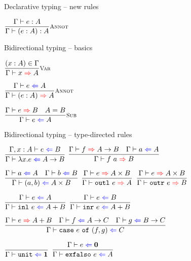 \documentclass{beamer}
\newcommand{\Fun}[2]{#1 \to #2}
\newcommand{\Prod}[2]{#1 \times #2}
\newcommand{\Sum}[2]{#1 + #2}
\newcommand{\Unit}{\textbf{1}}
\newcommand{\Empty}{\textbf{0}}
\newcommand{\annot}[2]{(#1 : #2)}
\newcommand{\fun}[2]{\lambda #1. #2}
\newcommand{\app}[2]{#1\ #2}
\newcommand{\pair}[2]{(#1, #2)}
\newcommand{\outl}[1]{\texttt{outl}\ #1}
\newcommand{\outr}[1]{\texttt{outr}\ #1}
\newcommand{\inl}[1]{\texttt{inl}\ #1}
\newcommand{\inr}[1]{\texttt{inr}\ #1}
\newcommand{\case}[3]{\texttt{case}\ #1\ \texttt{of}\ (#2, #3)}
\newcommand{\unit}{\texttt{unit}}
\newcommand{\exfalso}[1]{\texttt{exfalso}\ #1}
\newcommand{\fulltyping}[3]{#1 \vdash #2 : #3}
\newcommand{\typing}[2]{\fulltyping{\Gamma}{#1}{#2}}
\newcommand{\rulename}[1]{\textsc{\footnotesize{#1}}}
\newcommand{\infrule}[3][]{\displaystyle \frac{#2}{#3} \rulename{#1}}
\newcommand{\extend}[3]{#1, #2 : #3}
\newcommand{\sidecond}[1]{#1}
\begin{document}
\begin{frame}{Declarative typing -- new rules}

\begin{center}
  $\infrule[Annot]{\typing{e}{A}}{\typing{\annot{e}{A}}{A}}$
\end{center}

\end{frame}

\newcommand{\fullcheck}[3]{#1 \vdash #2 \mathcolor{blue}{\Leftarrow} #3}
\renewcommand{\check}[2]{\fullcheck{\Gamma}{#1}{#2}}

\newcommand{\fullinfer}[3]{#1 \vdash #2 \mathcolor{red}{\Rightarrow} #3}
\newcommand{\infer}[2]{\fullinfer{\Gamma}{#1}{#2}}

\begin{frame}{Bidirectional typing -- basics}

\begin{center}
  $\infrule[Var]{\sidecond{(x : A) \in \Gamma}}{\infer{x}{A}}$

  \vspace{2em}

  $\infrule[Annot]{\check{e}{A}}{\infer{\annot{e}{A}}{A}}$

  \vspace{2em}

  $\infrule[Sub]{\infer{e}{B} \quad \sidecond{A = B}}{\check{e}{A}}$
\end{center}

\end{frame}

\begin{frame}{Bidirectional typing -- type-directed rules}

\begin{center}
  $\infrule{\fullcheck{\extend{\Gamma}{x}{A}}{e}{B}}{\check{\fun{x}{e}}{\Fun{A}{B}}}$ \quad
  $\infrule{\infer{f}{\Fun{A}{B}} \quad \check{a}{A}}{\infer{\app{f}{a}}{B}}$

  \vspace{2em}

  $\infrule{\check{a}{A} \quad \check{b}{B}}{\check{\pair{a}{b}}{\Prod{A}{B}}}$ \quad
  $\infrule{\infer{e}{\Prod{A}{B}}}{\infer{\outl{e}}{A}}$ \quad
  $\infrule{\infer{e}{\Prod{A}{B}}}{\infer{\outr{e}}{B}}$

  \vspace{2em}

  $\infrule{\check{e}{A}}{\check{\inl{e}}{\Sum{A}{B}}}$ \quad
  $\infrule{\check{e}{B}}{\check{\inr{e}}{\Sum{A}{B}}}$

  \vspace{2em}

  $\infrule{\infer{e}{\Sum{A}{B}} \quad \check{f}{\Fun{A}{C}} \quad \check{g}{\Fun{B}{C}}}{\check{\case{e}{f}{g}}{C}}$

  \vspace{2em}

  $\infrule{}{\check{\unit}{\Unit}}$ \quad
  $\infrule{\check{e}{\Empty}}{\check{\exfalso{e}}{A}}$
\end{center}

\end{frame}
\end{document}
